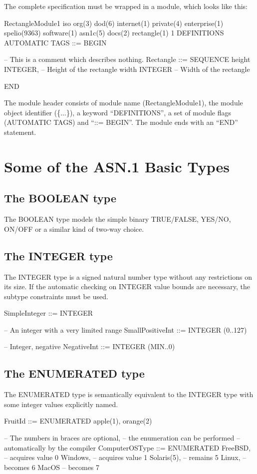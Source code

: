 \documentclass[english,oneside,12pt]{book}
\begin{document}
The complete specification must be wrapped in a module, which looks
like this:
\begin{asn}
RectangleModule1
    { iso org(3) dod(6) internet(1) private(4)
      enterprise(1) spelio(9363) software(1)
      asn1c(5) docs(2) rectangle(1) 1 }
    DEFINITIONS AUTOMATIC TAGS ::=
BEGIN

-- This is a comment which describes nothing.
Rectangle ::= SEQUENCE {
    height  INTEGER,        -- Height of the rectangle
    width   INTEGER         -- Width of the rectangle
}

END
\end{asn}
The module header consists of module name (RectangleModule1), the
module object identifier (\{...\}), a keyword ``DEFINITIONS'', a
set of module flags (AUTOMATIC TAGS) and ``::= BEGIN''. The module
ends with an ``END'' statement.


\section{Some of the ASN.1 Basic Types}


\subsection{The BOOLEAN type}

The BOOLEAN type models the simple binary TRUE/FALSE, YES/NO, ON/OFF
or a similar kind of two-way choice.


\subsection{The INTEGER type}

The INTEGER type is a signed natural number type without any restrictions
on its size. If the automatic checking on INTEGER value bounds are
necessary, the subtype constraints must be used.
\begin{asn}
SimpleInteger ::= INTEGER

-- An integer with a very limited range
SmallPositiveInt ::= INTEGER (0..127)

-- Integer, negative
NegativeInt ::= INTEGER (MIN..0)
\end{asn}

\subsection{The ENUMERATED type}

The ENUMERATED type is semantically equivalent to the INTEGER type
with some integer values explicitly named.
\begin{asn}
FruitId ::= ENUMERATED { apple(1), orange(2) }

-- The numbers in braces are optional,
-- the enumeration can be performed
-- automatically by the compiler
ComputerOSType ::= ENUMERATED {
    FreeBSD,          -- acquires value 0
    Windows,          -- acquires value 1
    Solaris(5),       -- remains 5
    Linux,            -- becomes 6
    MacOS             -- becomes 7
}
\end{asn}
\end{document}

